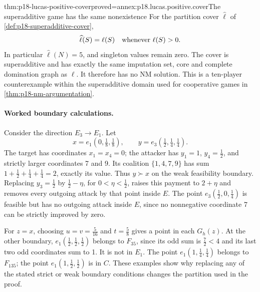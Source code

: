 \begin{hbtheorem}{thm:p18-lucas-positive-cover}{proved=annex:p18.lucas.positive.cover}{The superadditive game has the same nonexistence}
For the partition cover \(\widehat\ell\) of
\cref{def:p18-superadditive-cover},
\[
          \widehat\ell(S)=\ell(S)\quad\hbox{whenever }\ell(S)>0.
\]
In particular \(\widehat\ell(N)=5\), and singleton values remain
zero. The cover is superadditive and has exactly the same
imputation set, core and complete domination graph as \(\ell\).
It therefore has no NM solution. This is a ten-player
counterexample within the superadditive domain used for
cooperative games in \cref{thm:p18-nm-argumentation}.
\end{hbtheorem}

\paragraph{Worked boundary calculations.}
Consider the direction \(E_3\longrightarrow E_1\). Let
\[
 x=e_1(0,\tfrac18,\tfrac18),\qquad
 y=e_3(\tfrac12,\tfrac14,\tfrac14).
\]
The target has coordinates \(x_1=x_4=0\); the attacker has
\(y_1=1\), \(y_4=\tfrac12\), and strictly larger coordinates
7 and 9. Its coalition \(\{1,4,7,9\}\) has sum
\(1+\tfrac12+\tfrac14+\tfrac14=2\), exactly its value.
Thus \(y\succ x\) on the weak feasibility boundary. Replacing
\(y_3=\tfrac12\) by \(\tfrac12-\eta\), for
\(0<\eta<\tfrac12\), raises this payment to \(2+\eta\) and
removes every outgoing attack by that point inside \(E\).
The point \(e_3(\tfrac12,0,\tfrac14)\) is feasible but has no
outgoing attack inside \(E\), since no nonnegative coordinate
7 can be strictly improved by zero.

For \(z=x\), choosing \(u=v=\tfrac5{16}\) and
\(t=\tfrac58\) gives a point in each \(G_h(z)\).
At the other boundary, \(e_1(\tfrac12,\tfrac12,\tfrac12)\)
belongs to \(F_{35}\), since its odd sum is \(\tfrac72<4\)
and its last two odd coordinates sum to 1. It is not in \(E_1\).
The point \(e_1(1,\tfrac14,\tfrac14)\) belongs to \(F_{135}\);
the point \(e_1(1,\tfrac12,\tfrac12)\) is in \(C\).
These examples show why replacing any of the stated strict
or weak boundary conditions changes the partition used in
the proof.
